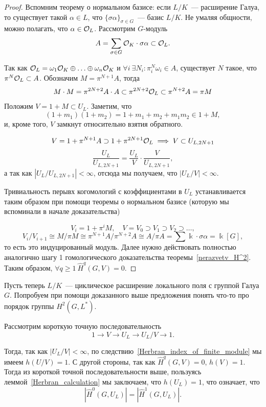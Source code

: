 	  \begin{proof}
	  	Вспомним теорему о нормальном базисе: если $L/K$~--- расширение Галуа, то существует такой $\alpha \in L$, что $\{ \sigma \alpha \}_{\sigma \in G}$~--- базис $L/K$. Не умаляя общности, можно полагать, что $\alpha \in \mathcal{O}_{L}$. Рассмотрим $G$-модуль
	  	\[
	  		A = \sum_{\sigma \in G} \mathcal{O}_{K} \cdot \sigma\alpha \subset \mathcal{O}_{L}.
	  	\]

	  	Так как $\mathcal{O}_{L} = \omega_1 \mathcal{O}_K \oplus \ldots \oplus \omega_n \mathcal{O}_{K}$ и $\forall i \ \exists N_i \colon \pi^N_{i} \omega_i \in A$, существует $N$ такое, что $\pi^N \mathcal{O}_{L} \subset A$. Обозначим $M = \pi^{N + 1}A$, тогда 
	  	\[
	  		M \cdot M = \pi^{2N + 2} A \cdot A \subset \pi^{2N + 2} \mathcal{O}_{L} \subset \pi^{N + 2} A = \pi M
	  	\]
	  	Положим $V = 1 + M \subset U_L$. Заметим, что 
	  	\[
	  		(1 + m_1)(1 + m_2) = 1 + m_1 + m_2 + m_1 m_2 \in 1 + M,
	  	\]
	  	и, кроме того, $V$ замкнут относительно взятия обратного. 

	  	\[
	  		V = 1 + \pi^{N + 1}A \supset 1 + \pi^{2N + 1}\mathcal{O}_{L} \implies V \subset U_{L, 2N + 1} 
	  	\]
	  	\[
	  		\frac{U_{L}}{U_{L, 2N + 1}} = \frac{U_L}{V} \cdot \frac{V}{U_{L, 2N + 1}},
	  	\]
	  	а так как $|U_L/U_{L, 2N + 1}| < \infty$, отсюда мы получаем, что $|U_{L}/V| < \infty$. 

	  	Тривиальность перывх когомологий с коэффициентами в $U_{L}$ устанавливается таким образом при помощи теоремы о нормальном базисе (которую мы вспоминали в начале доказательства)

	  	\[
	  	 	V_i = 1 + \pi^i M, \quad V = V_0 \supset V_1 \supset V_2 \supset \ldots,
	  	 \] 
	  	 \[
	  	 	V_i/V_{i + 1} \cong M/\pi M \cong \pi^{N+ 1}A/\pi^{N + 2}A \cong A / \pi A = \sum \Bbbk \cdot \sigma \alpha = \Bbbk[G],
	  	 \]
	  	 то есть это индуцированный модуль. Далее нужно действовать полностью аналогично шагу 1 гомологического доказательства теоремы~\ref{nerazvetv_H^2}. Таким образом, $\forall q \ge 1 \ \widehat{H}^q(G, V) = 0$.
	  \end{proof}

	  Пусть теперь $L/K$~---  циклическое расширение локального поля с группой Галуа $G$. Попробуем при помощи доказанного выше предложения понять что-то про порядок группы $H^2(G, L^*)$.

	  Рассмотрим короткую точную последовательность
	  \[
	  	1 \to V \to U_{L} \to U_L/V \to 1.
	  \]

	  Тогда, так как $|U_L/V| < \infty$, по следствию~\ref{Herbran_index_of_finite_module} мы имеем $h(U/V) = 1$. С другой стороны, так как $\widehat{H}^q(G, V) = 0$, $h(V) = 1$. Тогда из короткой точной последовательности выше, пользуясь леммой~\ref{Herbran_calculation} мы заключаем, что $h(U_L) = 1$, что означает, что 
	  \[
	  	|\widehat{H}^0(G, U_L)| = |\widehat{H}^1(G, U_L)|. 
	  \]


